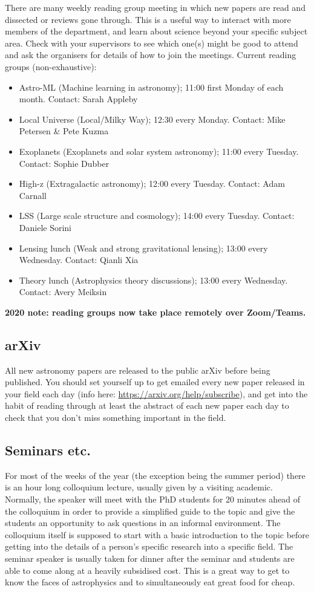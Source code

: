 There are many weekly reading group meeting in which new papers are read and dissected or reviews gone through. This is a useful way to interact with more members of the department, and learn about science beyond your specific subject area. Check with your supervisors to see which one(s) might be good to attend and ask the organisers for details of how to join the meetings. Current reading groups (non-exhaustive):
\begin{itemize}
    \item Astro-ML (Machine learning in astronomy); 11:00 first Monday of each month. Contact: Sarah Appleby
    \item Local Universe (Local/Milky Way); 12:30 every Monday. Contact: Mike Petersen \& Pete Kuzma
    \item Exoplanets (Exoplanets and solar system astronomy); 11:00 every Tuesday. Contact: Sophie Dubber
    \item High-z (Extragalactic astronomy); 12:00 every Tuesday. Contact: Adam Carnall
    \item LSS (Large scale structure and cosmology); 14:00 every Tuesday. Contact: Daniele Sorini
    \item Lensing lunch (Weak and strong gravitational lensing); 13:00 every Wednesday. Contact: Qianli Xia
    \item Theory lunch (Astrophysics theory discussions); 13:00 every Wednesday. Contact: Avery Meiksin
\end{itemize}

{\bf 2020 note: reading groups now take place remotely over Zoom/Teams.}

\subsection{arXiv}

All new astronomy papers are released to the public arXiv before being published.  You should set yourself up to get emailed every new paper released in your field each day (info here: \url{https://arxiv.org/help/subscribe}), and get into the habit of
reading through at least the abstract of each new paper each day to check that you don't miss something important in the field.

\subsection{Seminars etc.}

For most of the weeks of the year (the exception being the summer period) there is an hour long colloquium lecture, usually given by a visiting academic. Normally, the speaker will meet with the PhD students for 20 minutes ahead of the colloquium in order to provide a simplified guide to the topic and give the students an opportunity to ask questions in an informal environment.  The colloquium itself is supposed to start with a basic introduction to the topic before getting into the details of a person's specific research into a specific field. The seminar speaker is usually taken for dinner after the seminar and students are able to come along at a heavily subsidised cost. This is a great way to get to know the faces of astrophysics and to simultaneously eat great food for cheap.

